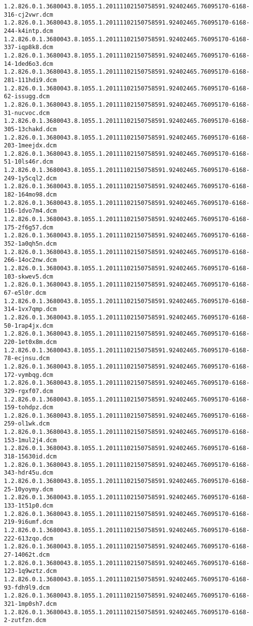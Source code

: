 \begin{lstlisting}
1.2.826.0.1.3680043.8.1055.1.20111102150758591.92402465.76095170-6168-316-cj2vwr.dcm 1.2.826.0.1.3680043.8.1055.1.20111102150758591.92402465.76095170-6168-244-k4intp.dcm 1.2.826.0.1.3680043.8.1055.1.20111102150758591.92402465.76095170-6168-337-iqp8k8.dcm 1.2.826.0.1.3680043.8.1055.1.20111102150758591.92402465.76095170-6168-14-1ded6o3.dcm 1.2.826.0.1.3680043.8.1055.1.20111102150758591.92402465.76095170-6168-281-111hdi9.dcm 1.2.826.0.1.3680043.8.1055.1.20111102150758591.92402465.76095170-6168-62-issugg.dcm 1.2.826.0.1.3680043.8.1055.1.20111102150758591.92402465.76095170-6168-31-nucvoc.dcm 1.2.826.0.1.3680043.8.1055.1.20111102150758591.92402465.76095170-6168-305-13chakd.dcm 1.2.826.0.1.3680043.8.1055.1.20111102150758591.92402465.76095170-6168-203-1meejdx.dcm 1.2.826.0.1.3680043.8.1055.1.20111102150758591.92402465.76095170-6168-51-10ls46r.dcm 1.2.826.0.1.3680043.8.1055.1.20111102150758591.92402465.76095170-6168-249-1y5cql2.dcm 1.2.826.0.1.3680043.8.1055.1.20111102150758591.92402465.76095170-6168-182-164mo98.dcm 1.2.826.0.1.3680043.8.1055.1.20111102150758591.92402465.76095170-6168-116-1dvo7m4.dcm 1.2.826.0.1.3680043.8.1055.1.20111102150758591.92402465.76095170-6168-175-2f6g57.dcm 1.2.826.0.1.3680043.8.1055.1.20111102150758591.92402465.76095170-6168-352-1a0qh5n.dcm 1.2.826.0.1.3680043.8.1055.1.20111102150758591.92402465.76095170-6168-266-14oc2nw.dcm 1.2.826.0.1.3680043.8.1055.1.20111102150758591.92402465.76095170-6168-103-skwev5.dcm 1.2.826.0.1.3680043.8.1055.1.20111102150758591.92402465.76095170-6168-67-e5l0r.dcm 1.2.826.0.1.3680043.8.1055.1.20111102150758591.92402465.76095170-6168-314-1vx7qmp.dcm 1.2.826.0.1.3680043.8.1055.1.20111102150758591.92402465.76095170-6168-50-1rap4jx.dcm 1.2.826.0.1.3680043.8.1055.1.20111102150758591.92402465.76095170-6168-220-1et0x8m.dcm 1.2.826.0.1.3680043.8.1055.1.20111102150758591.92402465.76095170-6168-78-ecjnsu.dcm 1.2.826.0.1.3680043.8.1055.1.20111102150758591.92402465.76095170-6168-172-vymbqg.dcm 1.2.826.0.1.3680043.8.1055.1.20111102150758591.92402465.76095170-6168-329-rgxf07.dcm 1.2.826.0.1.3680043.8.1055.1.20111102150758591.92402465.76095170-6168-159-tohdpz.dcm 1.2.826.0.1.3680043.8.1055.1.20111102150758591.92402465.76095170-6168-259-ol1wk.dcm 1.2.826.0.1.3680043.8.1055.1.20111102150758591.92402465.76095170-6168-153-1mul2j4.dcm 1.2.826.0.1.3680043.8.1055.1.20111102150758591.92402465.76095170-6168-318-15630id.dcm 1.2.826.0.1.3680043.8.1055.1.20111102150758591.92402465.76095170-6168-343-hdr45u.dcm 1.2.826.0.1.3680043.8.1055.1.20111102150758591.92402465.76095170-6168-25-10yoymy.dcm 1.2.826.0.1.3680043.8.1055.1.20111102150758591.92402465.76095170-6168-133-1t51p0.dcm 1.2.826.0.1.3680043.8.1055.1.20111102150758591.92402465.76095170-6168-219-9i6umf.dcm 1.2.826.0.1.3680043.8.1055.1.20111102150758591.92402465.76095170-6168-222-613zqo.dcm 1.2.826.0.1.3680043.8.1055.1.20111102150758591.92402465.76095170-6168-27-14062t.dcm 1.2.826.0.1.3680043.8.1055.1.20111102150758591.92402465.76095170-6168-123-1q9wztz.dcm 1.2.826.0.1.3680043.8.1055.1.20111102150758591.92402465.76095170-6168-93-fdh9l9.dcm 1.2.826.0.1.3680043.8.1055.1.20111102150758591.92402465.76095170-6168-321-1mp0sh7.dcm 1.2.826.0.1.3680043.8.1055.1.20111102150758591.92402465.76095170-6168-2-zutfzn.dcm 
\end{lstlisting}
